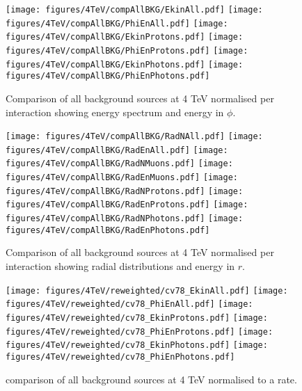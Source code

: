 \begin{figure}
\begin{center}
  \texttt{[image: figures/4TeV/compAllBKG/EkinAll.pdf]}
  \texttt{[image: figures/4TeV/compAllBKG/PhiEnAll.pdf]}
  \texttt{[image: figures/4TeV/compAllBKG/EkinProtons.pdf]}
  \texttt{[image: figures/4TeV/compAllBKG/PhiEnProtons.pdf]}
  \texttt{[image: figures/4TeV/compAllBKG/EkinPhotons.pdf]}
  \texttt{[image: figures/4TeV/compAllBKG/PhiEnPhotons.pdf]}
\end{center}
\vspace{-0.6cm}
 \caption{Comparison of all background sources at 4 TeV normalised per interaction showing energy spectrum and energy in $\phi$.
  \label{fig:compAllBKG_perInt1}}
\end{figure}

\begin{figure}
\begin{center}
  \texttt{[image: figures/4TeV/compAllBKG/RadNAll.pdf]}
  \texttt{[image: figures/4TeV/compAllBKG/RadEnAll.pdf]}
  \texttt{[image: figures/4TeV/compAllBKG/RadNMuons.pdf]}
  \texttt{[image: figures/4TeV/compAllBKG/RadEnMuons.pdf]}
  \texttt{[image: figures/4TeV/compAllBKG/RadNProtons.pdf]}
  \texttt{[image: figures/4TeV/compAllBKG/RadEnProtons.pdf]}
  \texttt{[image: figures/4TeV/compAllBKG/RadNPhotons.pdf]}
  \texttt{[image: figures/4TeV/compAllBKG/RadEnPhotons.pdf]}
\end{center}
\vspace{-0.6cm}
 \caption{Comparison of all background sources at 4 TeV normalised per interaction showing radial distributions and energy in $r$.
  \label{fig:compAllBKG_perInt2}}
\end{figure}

\begin{figure}
\begin{center}
  \texttt{[image: figures/4TeV/reweighted/cv78\_EkinAll.pdf]}
  \texttt{[image: figures/4TeV/reweighted/cv78\_PhiEnAll.pdf]}
  \texttt{[image: figures/4TeV/reweighted/cv78\_EkinProtons.pdf]}
  \texttt{[image: figures/4TeV/reweighted/cv78\_PhiEnProtons.pdf]}
  \texttt{[image: figures/4TeV/reweighted/cv78\_EkinPhotons.pdf]}
  \texttt{[image: figures/4TeV/reweighted/cv78\_PhiEnPhotons.pdf]}
\end{center}
\vspace{-0.6cm}
 \caption{comparison of all background sources at 4 TeV normalised to a rate.
  \label{compAllBKG4TeV_rates}}
\end{figure}


